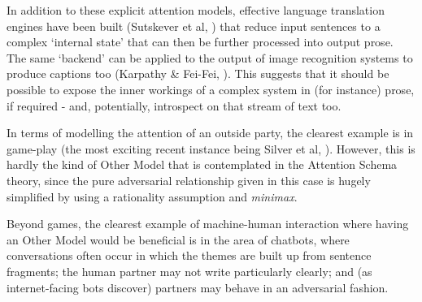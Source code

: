 \documentclass[citeauthoryear]{llncs}
\begin{document}



In addition to these explicit attention models, effective language translation
engines have been built (Sutskever et al, \cite{SequenceToSequence}) that reduce
input sentences to a complex `internal state' that can then be further processed into
output prose.  The same `backend' can be applied to the output of image recognition
systems to produce captions too (Karpathy \& Fei-Fei, \cite{karpathy2014deep}).
%
This suggests that it should be possible to expose the inner workings of 
a complex system in (for instance) prose, if required - and, potentially,
introspect on that stream of text too.




In terms of modelling the attention of an outside party, the clearest 
example is in game-play (the most exciting recent instance being Silver et al, \cite{AlphaGo}).
%
However, this is hardly the kind of Other Model that is contemplated in
the Attention Schema theory, since the pure adversarial relationship given in 
this case is hugely simplified by using a rationality assumption and \emph{minimax}.








Beyond games, the clearest example of machine-human interaction where having an Other Model
would be beneficial is in the area of chatbots, where conversations often occur in which the 
themes are built up from sentence fragments; the human partner may not
write particularly clearly; and (as internet-facing bots discover) partners
may behave in an adversarial fashion.
\end{document}
